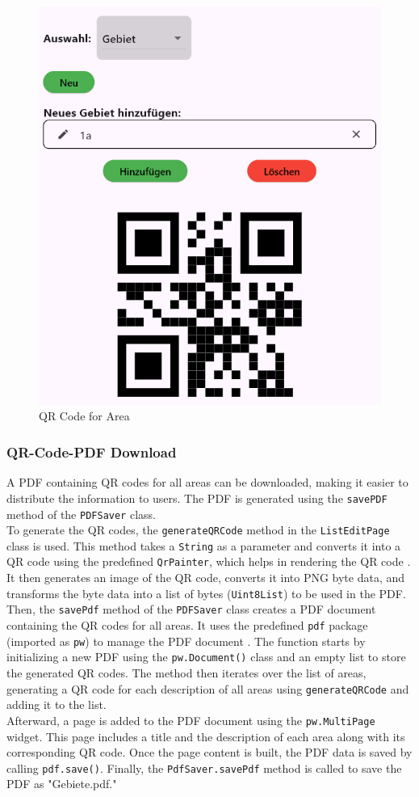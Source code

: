 \begin{figure}[H]
    \centering
    \includegraphics[width=0.4\linewidth]{images/AdminPanel/QrImageView.png}
    \caption{QR Code for Area}
\end{figure}

\subsubsection{QR-Code-PDF Download}
A PDF containing  QR codes for all areas can be downloaded, making it easier to distribute the information to users. The PDF is generated using the \texttt{savePDF} method of the \texttt{PDFSaver} class.\\

To generate the QR codes, the \texttt{generateQRCode} method in the \texttt{ListEditPage} class is used. This method takes a \texttt{String} as a parameter and converts it into a QR code using the predefined \texttt{QrPainter}, which helps in rendering the QR code \autocite{pub.dev/QrPainter-class}. It then generates an image of the QR code, converts it into PNG byte data, and transforms the byte data into a list of bytes (\texttt{Uint8List}) to be used in the PDF. \\

Then, the \texttt{savePdf} method of the \texttt{PDFSaver} class creates a PDF document containing the QR codes for all areas. It uses the predefined \texttt{pdf} package (imported as \texttt{pw}) to manage the PDF document \autocite{pub.dev/pdf}. The function starts by initializing a new PDF using the \texttt{pw.Document()} class and an empty list to store the generated QR codes. The method then iterates over the list of areas, generating a QR code for each description of all areas using \texttt{generateQRCode} and adding it to the list.\\

Afterward, a page is added to the PDF document using the \texttt{pw.MultiPage} widget. This page includes a title and the description of each area along with its corresponding QR code. Once the page content is built, the PDF data is saved by calling \texttt{pdf.save()}. Finally, the \texttt{PdfSaver.savePdf} method is called to save the PDF as "Gebiete.pdf."

